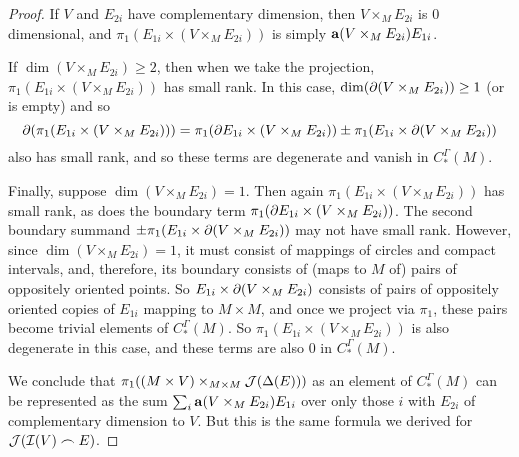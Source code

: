 \begin{proof}
	If $V$ and $E_{2i}$ have complementary dimension, then $V \times_M E_{2i}$ is $0$ dimensional, and $\pi_1(
	E_{1i} \times (V \times_M E_{2i}))$ is simply $\mathbf{a}(V \times_M E_{2i})E_{1i}$.

	If $\dim(V \times_M E_{2i})\geq 2$, then when we take the projection,
	$\pi_1(E_{1i} \times (V \times_M E_{2i}))$ has small rank.
	In this case, $\dim(\partial (V \times_M E_{2i}))\geq 1$ (or is empty) and so
	$$\partial(\pi_1(E_{1i} \times (V \times_M E_{2i}))) = \pi_1(\partial E_{1i} \times (V \times_M E_{2i}))\pm \pi_1(E_{1i} \times \partial(V \times_M E_{2i}))$$
	also has small rank, and so these terms are degenerate and vanish in $C^\Gamma_*(M)$.

	Finally, suppose $\dim(V \times_M E_{2i}) = 1$.
	Then again $\pi_1(E_{1i} \times (V \times_M E_{2i}))$ has small rank, as does the boundary term $\pi_1(\partial E_{1i} \times (V \times_M E_{2i}))$.
	The second boundary summand $\pm\pi_1(E_{1i} \times \partial(V \times_M E_{2i}))$ may not have small rank.
	However, since $\dim(V \times_M E_{2i}) = 1$, it must consist of mappings of circles and compact intervals, and, therefore, its boundary consists of (maps to $M$ of) pairs of oppositely oriented points.
	So $E_{1i} \times \partial(V \times_M E_{2i})$ consists of pairs of oppositely oriented copies of $E_{1i}$ mapping to $M \times M$, and once we project via $\pi_1$, these pairs become trivial elements of $C^\Gamma_*(M)$.
	So $\pi_1(E_{1i} \times (V \times_M E_{2i}))$ is also degenerate in this case, and these terms are also $0$ in $C^\Gamma_*(M)$.

	\begin{comment}
		We also have
		$$\bd ( V \times_M E_{2i}) = \pm (\bd V) \times_M E_{2i}\pm V \times_M \bd E_{2i}$$.
		Since $V$ is a cocycle, $\bd V$ is a union of trivial or small rank precochains, and hence so is $(\bd V) \times_M E_{2i}$ by Lemma \ref{L: pullback with Q}.
		If $\dim( V \times_M \bd E_{2i})>0$, then $\pi(V \times_M \bd E_{2i})$ has small rank.
		Finally, suppose $\dim (V \times_M \bd E_{2i}) = 0$.
		Then $\dim(V \times_M E_{2i}) = 1$.
		So $V \times_M E_{2i}$ consists of some number of circles and closed intervals in $E_{2i}$, and $V \times_M \bd E_{2i}$ will be the endpoints of those intervals.
		Since these must occur in pairs of opposite signs, then $E_{1i} \times (V \times_M \bd E_{2i})$ will consist of chains $\pm E_{1i} \times pt$, with the points being the points of $V \times_M \bd E_{2i}$.
		Since the points occur in oppositely signed pairs, under $\pi_1$ these pairs become trivial in $M$.
		Altogether then $\pi_1(\bd ( V \times_M E_{2i}))$ is a disjoint union of trivial and small rank precochains.
		So $V \times_M E_{2i} \in Q_*(M)$.
	\end{comment}

	We conclude that $\pi_1( (M \times V)\times_{M \times M}\mathcal{J}(\Delta(E)))$ as an element of $C_*^\Gamma(M)$ can be represented as the sum $\sum_i \mathbf{a}(V \times_M E_{2i})E_{1i}$ over only those $i$ with $E_{2i}$ of complementary dimension to $V$.
	But this is the same formula we derived for $\mathcal{J}(\mathcal{I}(V)\frown E)$.
\end{proof}

